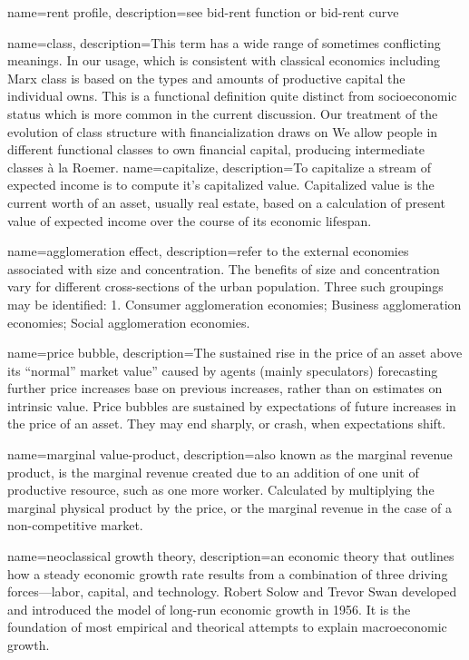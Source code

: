 {
name=rent profile,
description={see \gls{bid-rent function} or \gls{bid-rent curve}}
}

{
name=class,
description={This term has a wide range of sometimes conflicting meanings. In our usage, which is consistent with classical economics including Marx class is based on the types and amounts of productive capital the individual owns. This is a functional definition quite distinct from socioeconomic status which is more common in the current discussion. Our treatment of the evolution of class structure with financialization draws on We allow  people in different functional classes to own financial capital, producing intermediate classes \`a la Roemer\cite{roemerGeneralTheoryExploitation1982}.}
}
{
name=capitalize,
description={To capitalize a stream of expected income is to compute it's capitalized value. Capitalized value is the current worth of an asset, usually real estate, based on a calculation of present value of expected income over the course of its economic lifespan. }
}

{
name=agglomeration effect,
description={refer to the external economies associated with size and concentration. The benefits of size and concentration vary for different cross-sections of the urban population. Three such groupings may be identified: 1. Consumer agglomeration economies; Business agglomeration economies; Social agglomeration economies.\cite{carlinoAgglomerationEconomiesSurvey1978}}
}

{
name=price bubble,
description={The sustained rise in the price of an asset above its ``normal'' market value'' caused by agents (mainly speculators) forecasting further price increases base on previous increases, rather than on estimates on intrinsic value.  Price bubbles are sustained by expectations of future increases in the price of an asset. They may end sharply, or crash, when expectations shift.}
}

{
name=marginal value-product,
description={also known as the marginal revenue product, is the marginal revenue created due to an addition of one unit of productive resource, such as one more worker. Calculated by multiplying the marginal physical product by the price, or the marginal revenue in the case of a non-competitive market. }
}

{
name=neoclassical growth theory,
description={an economic theory that outlines how a steady economic growth rate results from a combination of three driving forces—labor, capital, and technology. Robert Solow and Trevor Swan developed and introduced the model of long-run economic growth in 1956. It is the  foundation of most empirical and theorical attempts to explain macroeconomic growth.}
}

